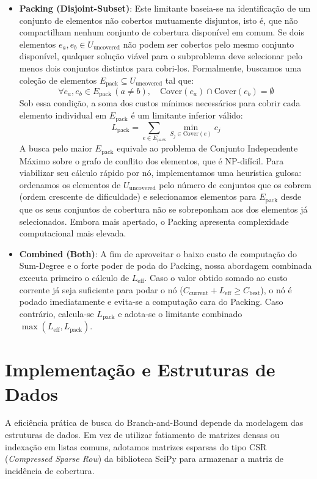\documentclass[conference]{IEEEtran}
\begin{document}
\begin{itemize}
\item \textbf{Packing (Disjoint-Subset)}: Este limitante baseia-se na identificação de um conjunto de elementos não cobertos mutuamente disjuntos, isto é, que não compartilham nenhum conjunto de cobertura disponível em comum. Se dois elementos $e_a, e_b \in U_{\text{uncovered}}$ não podem ser cobertos pelo mesmo conjunto disponível, qualquer solução viável para o subproblema deve selecionar pelo menos dois conjuntos distintos para cobri-los.
Formalmente, buscamos uma coleção de elementos $E_{\text{pack}} \subseteq U_{\text{uncovered}}$ tal que:
\begin{equation}
\forall e_a, e_b \in E_{\text{pack}} \, (a \neq b), \quad \text{Cover}(e_a) \cap \text{Cover}(e_b) = \emptyset
\end{equation}
Sob essa condição, a soma dos custos mínimos necessários para cobrir cada elemento individual em $E_{\text{pack}}$ é um limitante inferior válido:
\begin{equation}
L_{\text{pack}} = \sum_{e \in E_{\text{pack}}} \min_{S_j \in \text{Cover}(e)} c_j
\end{equation}
A busca pelo maior $E_{\text{pack}}$ equivale ao problema de Conjunto Independente Máximo sobre o grafo de conflito dos elementos, que é NP-difícil. Para viabilizar seu cálculo rápido por nó, implementamos uma heurística gulosa: ordenamos os elementos de $U_{\text{uncovered}}$ pelo número de conjuntos que os cobrem (ordem crescente de dificuldade) e selecionamos elementos para $E_{\text{pack}}$ desde que os seus conjuntos de cobertura não se sobreponham aos dos elementos já selecionados. Embora mais apertado, o Packing apresenta complexidade computacional mais elevada.

\item \textbf{Combined (Both)}: A fim de aproveitar o baixo custo de computação do Sum-Degree e o forte poder de poda do Packing, nossa abordagem combinada executa primeiro o cálculo de $L_{\text{eff}}$. Caso o valor obtido somado ao custo corrente já seja suficiente para podar o nó ($C_{\text{current}} + L_{\text{eff}} \ge C_{\text{best}}$), o nó é podado imediatamente e evita-se a computação cara do Packing. Caso contrário, calcula-se $L_{\text{pack}}$ e adota-se o limitante combinado $\max(L_{\text{eff}}, L_{\text{pack}})$.
\end{itemize}

\section{Implementação e Estruturas de Dados}
A eficiência prática de busca do Branch-and-Bound depende da modelagem das estruturas de dados. Em vez de utilizar fatiamento de matrizes densas ou indexação em listas comuns, adotamos matrizes esparsas do tipo CSR (\textit{Compressed Sparse Row}) da biblioteca SciPy para armazenar a matriz de incidência de cobertura. 
\end{document}
